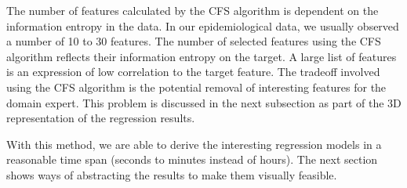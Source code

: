 \documentclass[journal]{style/vgtc} 			          %
\begin{document}
The number of features calculated by the CFS algorithm is dependent on the information entropy in the data.
In our epidemiological data, we usually observed a number of 10 to 30 features.
The number of selected features using the CFS algorithm reflects their information entropy on the target.
A large list of features is an expression of low correlation to the target feature.
The tradeoff involved using the CFS algorithm is the potential removal of interesting features for the domain expert.
This problem is discussed in the next subsection as part of the 3D representation of the regression results.

With this method, we are able to derive the interesting regression models in a reasonable time span (seconds to minutes instead of hours).
The next section shows ways of abstracting the results to make them visually feasible.

\end{document}
